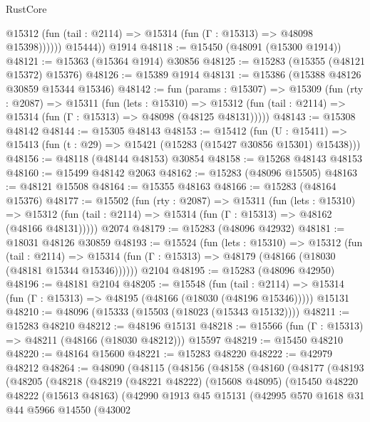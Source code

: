 \begin{lexlean}{RustCore}
\begin{coremodule}
              @15312 (fun (tail : @2114) => @15314 (fun (Γ : @15313) => @48098 @15398))))))
        @15444))
    @1914
@48118 := @15450 (@48091 (@15300 @1914))
@48121 := @15363 (@15364 @1914) @30856
@48125 := @15283 (@15355 (@48121 @15372) @15376)
@48126 := @15389 @1914
@48131 := @15386 (@15388 @48126 @30859 @15344 @15346)
@48142 := fun (params : @15307) =>
  @15309
    (fun (rty : @2087) =>
    @15311
      (fun (lets : @15310) =>
      @15312 (fun (tail : @2114) => @15314 (fun (Γ : @15313) => @48098 (@48125 @48131)))))
@48143 := @15308 @48142
@48144 := @15305 @48143
@48153 := @15412
    (fun (U : @15411) => @15413 (fun (t : @29) => @15421 (@15283 (@15427 @30856 @15301) @15438)))
@48156 := @48118 (@48144 @48153) @30854
@48158 := @15268 @48143 @48153
@48160 := @15499 @48142 @2063
@48162 := @15283 (@48096 @15505)
@48163 := @48121 @15508
@48164 := @15355 @48163
@48166 := @15283 (@48164 @15376)
@48177 := @15502
    (fun (rty : @2087) =>
    @15311
      (fun (lets : @15310) =>
      @15312 (fun (tail : @2114) => @15314 (fun (Γ : @15313) => @48162 (@48166 @48131)))))
    @2074
@48179 := @15283 (@48096 @42932)
@48181 := @18031 @48126 @30859
@48193 := @15524
    (fun (lets : @15310) =>
    @15312
      (fun (tail : @2114) =>
      @15314 (fun (Γ : @15313) => @48179 (@48166 (@18030 (@48181 @15344 @15346))))))
    @2104
@48195 := @15283 (@48096 @42950)
@48196 := @48181 @2104
@48205 := @15548
    (fun (tail : @2114) => @15314 (fun (Γ : @15313) => @48195 (@48166 (@18030 (@48196 @15346)))))
    @15131
@48210 := @48096 (@15333 (@15503 (@18023 (@15343 @15132))))
@48211 := @15283 @48210
@48212 := @48196 @15131
@48218 := @15566 (fun (Γ : @15313) => @48211 (@48166 (@18030 @48212))) @15597
@48219 := @15450 @48210
@48220 := @48164 @15600
@48221 := @15283 @48220
@48222 := @42979 @48212
@48264 := @48090
    (@48115
      (@48156
        (@48158
          (@48160
            (@48177
              (@48193
                (@48205
                  (@48218
                    (@48219
                      (@48221 @48222)
                      (@15608 @48095)
                      (@15450
                        @48220
                        @48222
                        (@15613 @48163)
                        (@42990
                          @1913
                          @45
                          @15131
                          (@42995
                            @570
                            @1618
                            @31
                            @44
                            @5966
                            @14550
                            (@43002

\end{coremodule}
\end{lexlean}
